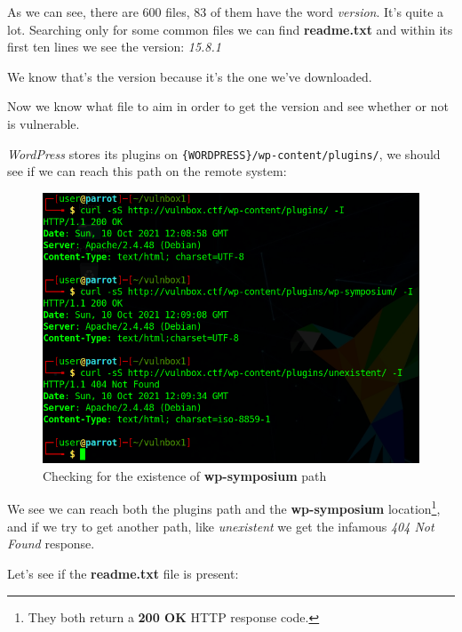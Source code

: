 \documentclass[12pt]{article}
\begin{document}
    As we can see, there are 600 files, 83 of them have the word
    \textit{version}. It's quite a lot.
    Searching only for some common files we can find \textbf{readme.txt} and
    within its first ten lines we see the version: \textit{15.8.1}

    We know that's the version because it's the one we've downloaded.

    Now we know what file to aim in order to get the version and see whether or
    not is vulnerable.

    \textit{WordPress} stores its plugins on 
    \verb!{WORDPRESS}/wp-content/plugins/!, we should see if we can reach this
    path on the remote system:

    \begin{figure}[H]\label{pic:20-curl-symposium-check}
        \centering
        \includegraphics[width=1.00\textwidth]{20-curl-symposium-check.png}
        \caption{Checking for the existence of \textbf{wp-symposium} path}
    \end{figure}

    We see we can reach both the plugins path and the \textbf{wp-symposium}
    location\footnote{They both return a \textbf{200 OK} HTTP response code.},
    and if we try to get another path, like \textit{unexistent} we get the
    infamous \textit{404 Not Found} response.

    Let's see if the \textbf{readme.txt} file is present:
\end{document}
